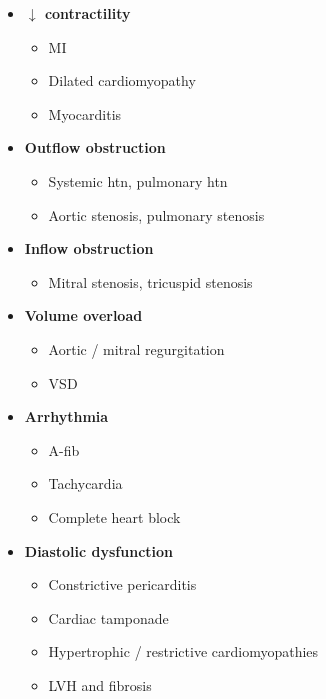 \documentclass[
  12pt,
]{memoir}
\providecommand{\tightlist}{%
  \setlength{\itemsep}{0pt}\setlength{\parskip}{0pt}}
\begin{document}
\begin{itemize}
\tightlist
\item
  \textbf{\(\downarrow\) contractility}

  \begin{itemize}
  \tightlist
  \item
    MI
  \item
    Dilated cardiomyopathy
  \item
    Myocarditis
  \end{itemize}
\item
  \textbf{Outflow obstruction}

  \begin{itemize}
  \tightlist
  \item
    Systemic htn, pulmonary htn
  \item
    Aortic stenosis, pulmonary stenosis
  \end{itemize}
\item
  \textbf{Inflow obstruction}

  \begin{itemize}
  \tightlist
  \item
    Mitral stenosis, tricuspid stenosis
  \end{itemize}
\item
  \textbf{Volume overload}

  \begin{itemize}
  \tightlist
  \item
    Aortic / mitral regurgitation
  \item
    VSD
  \end{itemize}
\item
  \textbf{Arrhythmia}

  \begin{itemize}
  \tightlist
  \item
    A-fib
  \item
    Tachycardia
  \item
    Complete heart block
  \end{itemize}
\item
  \textbf{Diastolic dysfunction}

  \begin{itemize}
  \tightlist
  \item
    Constrictive pericarditis
  \item
    Cardiac tamponade
  \item
    Hypertrophic / restrictive cardiomyopathies
  \item
    LVH and fibrosis
  \end{itemize}
\end{itemize}
\end{document}
